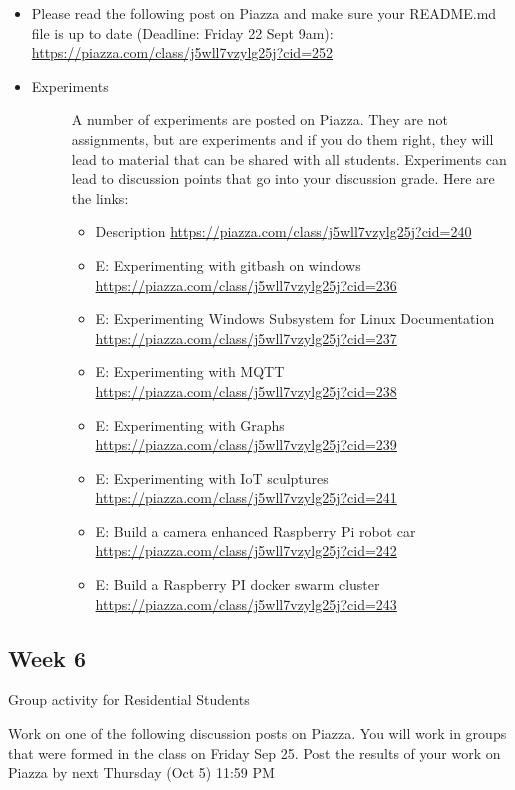 \begin{itemize}
\item
  Please read the following post on Piazza and make sure your README.md
  file is up to date (Deadline: Friday 22 Sept 9am):
  \url{https://piazza.com/class/j5wll7vzylg25j?cid=252}
\item
  \begin{description}
  \item[Experiments]
  A number of experiments are posted on Piazza. They are not
  assignments, but are experiments and if you do them right, they will
  lead to material that can be shared with all students. Experiments can
  lead to discussion points that go into your discussion grade. Here are
  the links:

  \begin{itemize}

  \item
    Description \url{https://piazza.com/class/j5wll7vzylg25j?cid=240}
  \item
    E: Experimenting with gitbash on windows
    \url{https://piazza.com/class/j5wll7vzylg25j?cid=236}
  \item
    E: Experimenting Windows Subsystem for Linux Documentation
    \url{https://piazza.com/class/j5wll7vzylg25j?cid=237}
  \item
    E: Experimenting with MQTT
    \url{https://piazza.com/class/j5wll7vzylg25j?cid=238}
  \item
    E: Experimenting with Graphs
    \url{https://piazza.com/class/j5wll7vzylg25j?cid=239}
  \item
    E: Experimenting with IoT sculptures
    \url{https://piazza.com/class/j5wll7vzylg25j?cid=241}
  \item
    E: Build a camera enhanced Raspberry Pi robot car
    \url{https://piazza.com/class/j5wll7vzylg25j?cid=242}
  \item
    E: Build a Raspberry PI docker swarm cluster
    \url{https://piazza.com/class/j5wll7vzylg25j?cid=243}
  \end{itemize}
  \end{description}
\end{itemize}

\subsection{Week 6}\label{week-6}

Group activity for Residential Students

Work on one of the following discussion posts on Piazza. You will work
in groups that were formed in the class on Friday Sep 25. Post the
results of your work on Piazza by next Thursday (Oct 5) 11:59 PM

